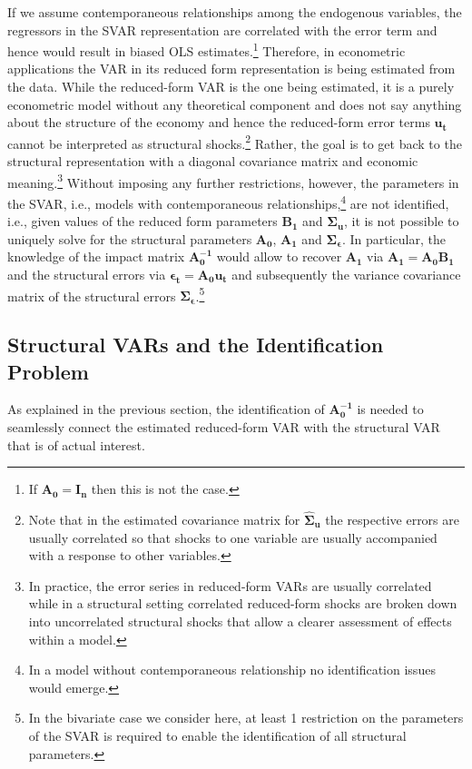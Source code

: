 \documentclass[a4paper,11pt,listof=nochaptergap,oneside,pointednumbers,bibtotoc,bigheadings,liststotoc]{scrbook}
\theoremstyle{mysatz}
\theoremstyle{mydefinition}
\theoremstyle{mytheorem}
\theoremstyle{mybemerkung}
\newcommand{\vect}[1]{\boldsymbol{\mathbf{#1}}}
\begin{document}
If we assume contemporaneous relationships among the endogenous variables, the regressors in the SVAR representation are correlated with the error term and hence would result in biased OLS estimates.\footnote{If $\vect{A_0} = \vect{I_n}$ then this is not the case.} Therefore, in econometric applications the VAR in its reduced form representation is being estimated from the data. While the reduced-form VAR is the one being estimated, it is a purely econometric model without any theoretical component and does not say anything about the structure of the economy and hence the reduced-form error terms $\vect{u_t}$ cannot be interpreted as structural shocks.\footnote{Note that in the estimated covariance matrix for $\vect{\hat{\Sigma}_u}$ the respective errors are usually correlated so that shocks to one variable are usually accompanied with a response to other variables.} Rather, the goal is to get back to the structural representation with a diagonal covariance matrix and economic meaning.\footnote{In practice, the error series in reduced-form VARs are usually correlated while in a structural setting correlated reduced-form shocks are broken down into uncorrelated structural shocks that allow a clearer assessment of effects within a model.} Without imposing any further restrictions, however, the parameters in the SVAR, i.e., models with contemporaneous relationships,\footnote{In a model without contemporaneous relationship no identification issues would emerge.} are not identified, i.e., given values of the reduced form parameters $\vect{B_1}$ and $\vect{\Sigma_u}$, it is not possible to uniquely solve for the structural parameters $\vect{A_0}$, $\vect{A_1}$ and $\vect{\Sigma_\epsilon}$. In particular, the knowledge of the impact matrix $\vect{A_0^{-1}}$ would allow to recover $\vect{A_1}$ via $\vect{A_1} = \vect{A_0}\vect{B_1}$ and the structural errors via $\vect{\epsilon_t} = \vect{A_0}\vect{u_t}$ and subsequently the variance covariance matrix of the structural errors $\vect{\Sigma_\epsilon}$.\footnote{In the bivariate case we consider here, at least 1 restriction on the parameters of the SVAR is required to enable the identification of all structural parameters. }

\subsection{Structural VARs and the Identification Problem}
\label{sec:strcuturalVARsIdentification}
As explained in the previous section, the identification of $\vect{A_0^{-1}}$ is needed to seamlessly connect the estimated reduced-form VAR with the structural VAR that is of actual interest.
\end{document}

